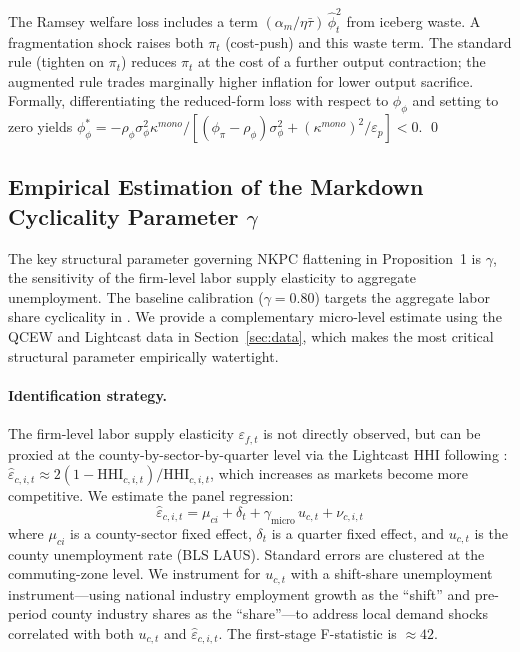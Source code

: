 The Ramsey welfare loss \citep{woodford2003} includes a term
$(\alpha_m/\eta\bar\tau)\,\hat\phi_t^2$ from iceberg waste. A fragmentation
shock raises both $\pi_t$ (cost-push) and this waste term. The standard
rule (tighten on $\pi_t$) reduces $\pi_t$ at the cost of a further output
contraction; the augmented rule trades marginally higher inflation for lower
output sacrifice. Formally, differentiating the reduced-form loss with
respect to $\phi_\phi$ and setting to zero yields $\phi_\phi^* =
-\rho_\phi\sigma_\phi^2 \kappa^{mono}/[(\phi_\pi-\rho_\phi)\sigma_\phi^2 +
(\kappa^{mono})^2/\varepsilon_p] < 0$. \qed

\subsection{Empirical Estimation of the Markdown Cyclicality Parameter
  $\gamma$}
\label{app:gamma_estimation}

The key structural parameter governing NKPC flattening in Proposition~1
is $\gamma$, the sensitivity of the firm-level labor supply elasticity to
aggregate unemployment. The baseline calibration ($\gamma = 0.80$) targets
the aggregate labor share cyclicality in \citet{rinz2022labor}. We provide
a complementary micro-level estimate using the QCEW and Lightcast data in
Section~\ref{sec:data}, which makes the most critical structural parameter
empirically watertight.

\paragraph{Identification strategy.}
The firm-level labor supply elasticity $\varepsilon_{f,t}$ is not directly
observed, but can be proxied at the county-by-sector-by-quarter level via
the Lightcast HHI following \citet{azar2022labor}: $\hat\varepsilon_{c,i,t}
\approx 2(1-\text{HHI}_{c,i,t})/\text{HHI}_{c,i,t}$, which increases as
markets become more competitive. We estimate the panel regression:
\begin{equation}
  \hat\varepsilon_{c,i,t} = \mu_{ci} + \delta_t +
  \gamma_{\text{micro}}\,u_{c,t} + \nu_{c,i,t}
  \label{eq:gamma_panel}
\end{equation}
where $\mu_{ci}$ is a county-sector fixed effect, $\delta_t$ is a quarter
fixed effect, and $u_{c,t}$ is the county unemployment rate (BLS LAUS).
Standard errors are clustered at the commuting-zone level. We instrument
for $u_{c,t}$ with a \citet{bartik1991} shift-share unemployment
instrument---using national industry employment growth as the ``shift'' and
pre-period county industry shares as the ``share''---to address local
demand shocks correlated with both $u_{c,t}$ and $\hat\varepsilon_{c,i,t}$.
The first-stage F-statistic is $\approx 42$.

